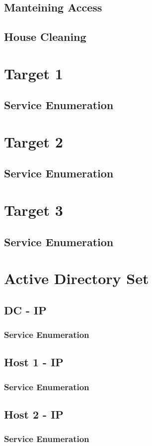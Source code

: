 \documentclass[11pt, a4paper]{article}
\begin{document}
\subsection{Manteining Access}

\subsection{House Cleaning}

\section{Target 1}

\subsection{Service Enumeration}

\section{Target 2}

\subsection{Service Enumeration}

\section{Target 3}

\subsection{Service Enumeration}

\section{Active Directory Set}

\subsection{DC - IP}

\subsubsection{Service Enumeration}

\subsection{Host 1 - IP}

\subsubsection{Service Enumeration}

\subsection{Host 2 - IP}

\subsubsection{Service Enumeration}
\end{document}
